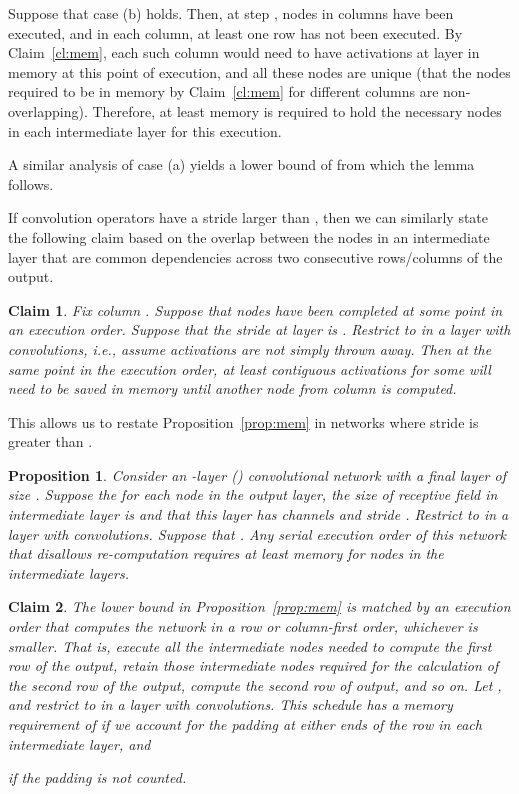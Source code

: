 \documentclass[10pt]{article}
\newtheorem{proposition}{Proposition}
\newtheorem{claim}{Claim}
\begin{document}
Suppose that case (b) holds. Then, at step , nodes in 
columns  have been executed, and in each column,
at least one row has not been executed. By Claim~\ref{cl:mem}, each such column
would need to have  activations at layer  in memory at this point
of execution, and all these nodes are unique (that the nodes required
to be in memory by Claim~\ref{cl:mem} for different columns are non-overlapping).
Therefore, at least  memory is required
to hold the necessary nodes in each intermediate layer for this execution.

A similar analysis of case (a) yields a lower bound of
 from which the lemma follows.
\hfill 

If convolution operators have a stride larger than , then we can
similarly state the following claim based on the overlap between the
nodes in an intermediate layer that are common dependencies across two
consecutive rows/columns of the output.

\begin{claim}
\label{cl:mem-stride}
Fix column . Suppose that nodes  have been completed at some point in an execution order. Suppose
that the stride at layer  is . Restrict  to  in a
layer with  convolutions, i.e., assume activations are not
simply thrown away. Then at the same point in the execution order, at
least  contiguous activations
 for some  will
need to be saved in memory until another node from column  is
computed.
\end{claim}


This allows us to restate Proposition~\ref{prop:mem} in networks
where stride is greater than .

\begin{proposition}
	\label{prop:mem-stride}
	Consider an -layer () convolutional network with a
        final layer of size .  Suppose the for each node in
        the output layer, the size of receptive field in intermediate
        layer  is  and that
        this layer has  channels and stride .  Restrict
         to  in a layer with  convolutions. Suppose
        that .  Any serial
        execution order of this network that disallows re-computation
        requires at least 
        memory for nodes in the intermediate layers.
\end{proposition}


\begin{claim}
\label{cl:upper-interm}
The lower bound in Proposition~\ref{prop:mem} is matched by an
execution order that computes the network in a row or column-first
order, whichever is smaller. That is, execute all the intermediate
nodes needed to compute the first row of the output, retain those
intermediate nodes required for the calculation of the second row of
the output, compute the second row of output, and so on.  Let , and restrict  to  in a layer with  convolutions.  This schedule has a memory requirement of 
if we account for the padding at either ends of the row in each
intermediate layer, and

if the padding is not counted.
\end{claim}
\end{document}

